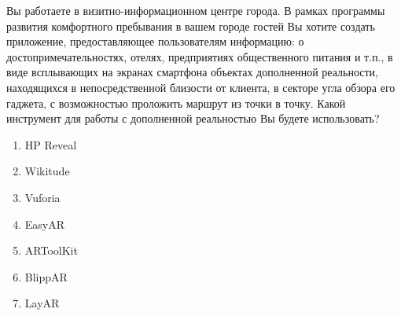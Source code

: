 
Вы работаете в визитно-информационном центре города. В рамках программы развития комфортного пребывания в вашем городе гостей Вы хотите создать приложение, предоставляющее пользователям информацию: о достопримечательностях, отелях, предприятиях общественного питания и т.п., в виде всплывающих на экранах смартфона объектах дополненной реальности, находящихся в непосредственной близости от клиента, в секторе угла обзора его гаджета, с возможностью проложить маршрут из точки в точку. Какой инструмент для работы с дополненной реальностью Вы будете использовать?

\begin{enumerate}
    \item HP Reveal
    \item Wikitude
    \item Vuforia
    \item EasyAR
    \item ARToolKit
    \item BlippAR
    \item LayAR
\end{enumerate}